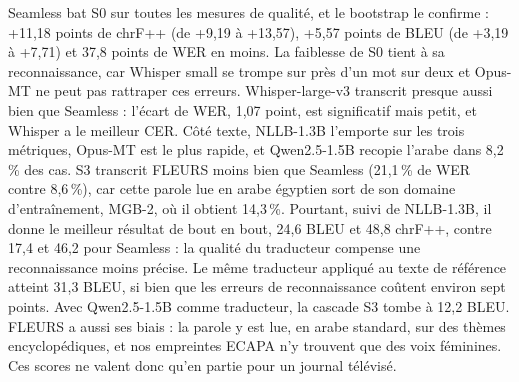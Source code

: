 \documentclass[10pt]{article}
\begin{document}
Seamless bat S0 sur toutes les mesures de qualité, et le bootstrap le confirme : +11,18 points de chrF++ (de +9,19 à +13,57), +5,57 points de BLEU (de +3,19 à +7,71) et 37,8 points de WER en moins. La faiblesse de S0 tient à sa reconnaissance, car Whisper small se trompe sur près d'un mot sur deux et Opus-MT ne peut pas rattraper ces erreurs. Whisper-large-v3 transcrit presque aussi bien que Seamless : l'écart de WER, 1,07 point, est significatif mais petit, et Whisper a le meilleur CER. Côté texte, NLLB-1.3B l'emporte sur les trois métriques, Opus-MT est le plus rapide, et Qwen2.5-1.5B recopie l'arabe dans 8,2\,\% des cas. S3 transcrit FLEURS moins bien que Seamless (21,1\,\% de WER contre 8,6\,\%), car cette parole lue en arabe égyptien sort de son domaine d'entraînement, MGB-2, où il obtient 14,3\,\%. Pourtant, suivi de NLLB-1.3B, il donne le meilleur résultat de bout en bout, 24,6 BLEU et 48,8 chrF++, contre 17,4 et 46,2 pour Seamless : la qualité du traducteur compense une reconnaissance moins précise. Le même traducteur appliqué au texte de référence atteint 31,3 BLEU, si bien que les erreurs de reconnaissance coûtent environ sept points. Avec Qwen2.5-1.5B comme traducteur, la cascade S3 tombe à 12,2 BLEU. FLEURS a aussi ses biais : la parole y est lue, en arabe standard, sur des thèmes encyclopédiques, et nos empreintes ECAPA n'y trouvent que des voix féminines. Ces scores ne valent donc qu'en partie pour un journal télévisé.
\end{document}
